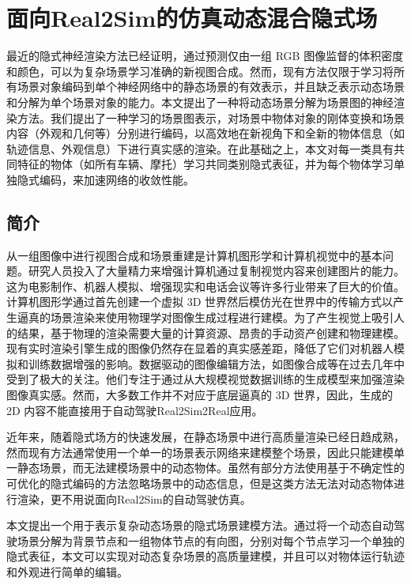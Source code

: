 \chapter{面向Real2Sim的仿真动态混合隐式场}
\label{chapter: scene-graph}
最近的隐式神经渲染方法已经证明，通过预测仅由一组 RGB 图像监督的体积密度和颜色，可以为复杂场景学习准确的新视图合成。然而，现有方法仅限于学习将所有场景对象编码到单个神经网络中的静态场景的有效表示，并且缺乏表示动态场景和分解为单个场景对象的能力。本文提出了一种将动态场景分解为场景图的神经渲染方法。我们提出了一种学习的场景图表示，对场景中物体对象的刚体变换和场景内容（外观和几何等）分别进行编码，以高效地在新视角下和全新的物体信息（如轨迹信息、外观信息）下进行真实感的渲染。在此基础之上，本文对每一类具有共同特征的物体（如所有车辆、摩托）学习共同类别隐式表征，并为每个物体学习单独隐式编码，来加速网络的收敛性能。

\section{简介}

从一组图像中进行视图合成和场景重建是计算机图形学和计算机视觉中的基本问题。研究人员投入了大量精力来增强计算机通过复制视觉内容来创建图片的能力。这为电影制作、机器人模拟、增强现实和电话会议等许多行业带来了巨大的价值。计算机图形学通过首先创建一个虚拟 3D 世界然后模仿光在世界中的传输方式以产生逼真的场景渲染来使用物理学对图像生成过程进行建模。为了产生视觉上吸引人的结果，基于物理的渲染需要大量的计算资源、昂贵的手动资产创建和物理建模。现有实时渲染引擎生成的图像仍然存在显着的真实感差距，降低了它们对机器人模拟和训练数据增强的影响。数据驱动的图像编辑方法，如图像合成等在过去几年中受到了极大的关注。他们专注于通过从大规模视觉数据训练的生成模型来加强渲染图像真实感。然而，大多数工作并不对应于底层逼真的 3D 世界，因此，生成的 2D 内容不能直接用于自动驾驶Real2Sim2Real应用。

近年来，随着隐式场方\cite{mildenhall_nerf_2020, barron_mip-nerf_2022, muller_instant_2022}的快速发展，在静态场景中进行高质量渲染已经日趋成熟，然而现有方法通常使用一个单一的场景表示网络来建模整个场景，因此只能建模单一静态场景，而无法建模场景中的动态物体。虽然有部分方法使用基于不确定性的可优化的隐式编码的方法忽略场景中的动态信息\cite{martin-brualla_nerf_2021}，但是这类方法无法对动态物体进行渲染，更不用说面向Real2Sim的自动驾驶仿真。

本文提出一个用于表示复杂动态场景的隐式场景建模方法。通过将一个动态自动驾驶场景分解为背景节点和一组物体节点的有向图，分别对每个节点学习一个单独的隐式表征，本文可以实现对动态复杂场景的高质量建模，并且可以对物体运行轨迹和外观进行简单的编辑。

